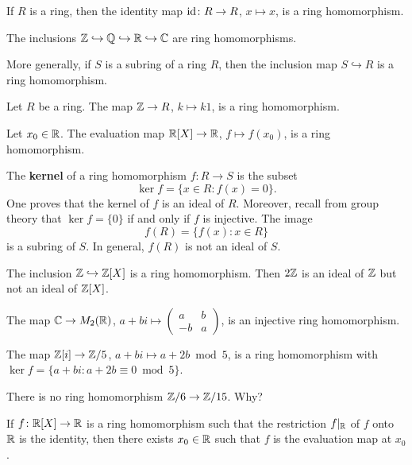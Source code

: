If $R$ is a ring, then  
the identity map $\operatorname{id}\colon R\to R$, $x\mapsto x$, is a ring homomorphism. 	

\begin{example}
The inclusions $\mathbb{Z}\hookrightarrow\mathbb{Q}\hookrightarrow\mathbb{R}\hookrightarrow\mathbb{C}$ 
are ring homomorphisms. 	
\end{example}

More generally, if $S$ is a subring of a ring $R$, then the inclusion map 
$S\hookrightarrow R$ is a ring homomorphism. 

\begin{example}
Let $R$ be a ring. 
The map $\mathbb{Z}\to R$, $k\mapsto k1$, is a ring homomorphism. 	
\end{example}

\begin{example}
Let $x_0\in\mathbb{R}$. The evaluation map $\mathbb{R}[X]\to\mathbb{R}$, $f\mapsto f(x_0)$, 
is a ring homomorphism. 	
\end{example}

The \textbf{kernel} of a ring homomorphism
$f\colon R\to S$ is the subset
\[
\ker f=\{x\in R:f(x)=0\}.
\]
One proves that the kernel of $f$ is an ideal of $R$.  
Moreover, recall from group theory that 
$\ker f=\{0\}$ if and only if $f$ is injective. The image 
\[
f(R)=\{f(x):x\in R\}
\]
is a subring of $S$. In general, $f(R)$ is not an ideal of $S$. 

\begin{example}
The inclusion $\mathbb{Z}\hookrightarrow\mathbb{Z}[X]$ is a ring homomorphism. Then
$2\mathbb{Z}$ is an ideal of $\mathbb{Z}$ but not an ideal of $\mathbb{Z}[X]$. 
\end{example}

\begin{example}
	The map $\mathbb{C}\to M_2(\mathbb{R})$, $a+bi\mapsto\begin{pmatrix}a&b\\-b&a\end{pmatrix}$, is an injective
	ring homomorphism. 	
\end{example}

\begin{example}
The map $\mathbb{Z}[i]\to\mathbb{Z}/5$, $a+bi\mapsto a+2b\bmod 5$, is a ring homomorphism 
with $\ker f=\{a+bi:a+2b\equiv 0\bmod 5\}$. 	
\end{example}

\begin{exercise}
There is no ring homomorphism $\mathbb{Z}/6\to\mathbb{Z}/15$. Why?	
\end{exercise}

\begin{exercise}
If $f\colon\mathbb{R}[X]\to\mathbb{R}$ is a ring homomorphism 
such that the restriction $f|_{\mathbb{R}}$ of 
$f$ onto $\mathbb{R}$ is the identity, then there exists $x_0\in\mathbb{R}$ such that 
$f$ is the evaluation map at $x_0$. 
\end{exercise}

